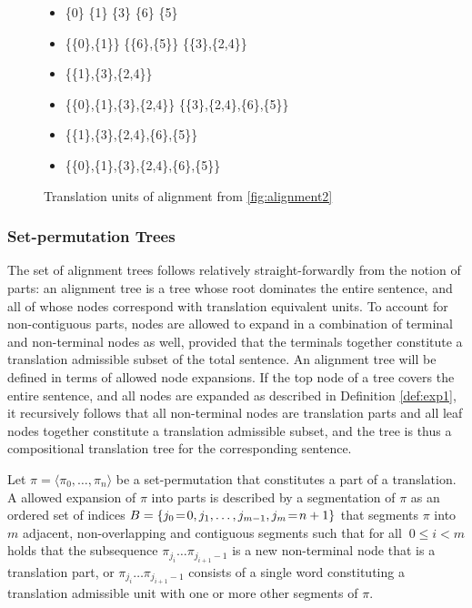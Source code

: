 \begin{figure}[!ht]
\begin{framed}
\small{
\begin{itemize}
\item \{0\} \hfill \{1\} \hfill \{3\} \hfill \{6\} \hfill \{5\} \hfill
\item \{\{0\},\{1\}\} \hfill  \{\{6\},\{5\}\} \hfill \{\{3\},\{2,4\}\}
\item \{\{1\},\{3\},\{2,4\}\}
\item \{\{0\},\{1\},\{3\},\{2,4\}\} \hfill \{\{3\},\{2,4\},\{6\},\{5\}\}
\item \{\{1\},\{3\},\{2,4\},\{6\},\{5\}\}
\item \{\{0\},\{1\},\{3\},\{2,4\},\{6\},\{5\}\}
\end{itemize}
}
\end{framed}
\caption{Translation units of alignment from \ref{fig:alignment2}}\label{fig:transequi}
\end{figure}

\subsubsection{Set-permutation Trees}

The set of alignment trees follows relatively straight-forwardly from the notion of parts: an alignment tree is a tree whose root dominates the entire sentence, and all of whose nodes correspond with translation equivalent units. To account for non-contiguous parts, nodes are allowed to expand in a combination of terminal and non-terminal nodes as well, provided that the terminals together constitute a translation admissible subset of the total sentence. An alignment tree will be defined in terms of allowed node expansions. If the top node of a tree covers the entire sentence, and all nodes are expanded as described in Definition \ref{def:exp1}, it recursively follows that all non-terminal nodes are translation parts and all leaf nodes together constitute a translation admissible subset, and the tree is thus a compositional translation tree for the corresponding sentence.

\begin{definition}\label{def:exp1}
Let $\pi = \langle \pi_0, \ldots,\pi_n\rangle$ be a set-permutation that constitutes a part of a translation. A allowed expansion of $\pi$ into parts is described by a segmentation of $\pi$ as an ordered set of indices $B = \{j_0\negthinspace=\negthinspace 0, j_1, \ldots ,j_{m-1},j_m\negthinspace=\negthinspace n+1\}$ that segments $\pi$ into $m$ adjacent, non-overlapping and contiguous segments such that for all $~0\leq i < m$ holds that the subsequence $\pi_{j_i}\ldots\pi_{j_{i+1}-1}$ is a new non-terminal node that is a translation part, or $\pi_{j_i}\ldots\pi_{j_{i+1}-1}$ consists of a single word constituting a translation admissible unit with one or more other segments of $\pi$.
\end{definition}

